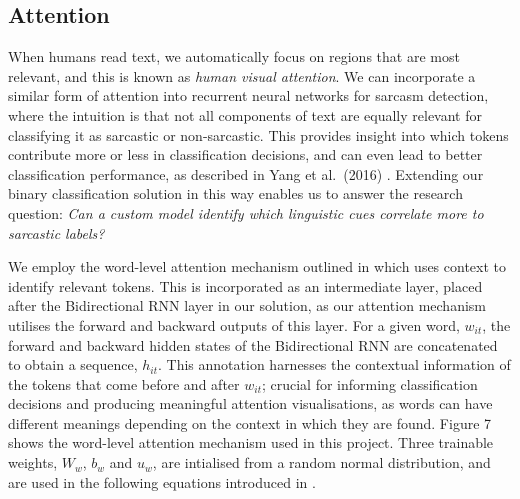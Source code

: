\documentclass[12pt,a4paper]{article}
\begin{document}

\subsection{Attention}
\vspace{-4.2pt}
\noindent When humans read text, we automatically focus on regions that are most relevant, and this is known as \textit{human visual attention}. We can incorporate a similar form of attention into recurrent neural networks for sarcasm detection, where the intuition is that not all components of text are equally relevant for classifying it as sarcastic or non-sarcastic. This provides insight into which tokens contribute more or less in classification decisions, and can even lead to better classification performance, as described in Yang et al.\ (2016) \cite{yang2016hierarchical}. Extending our binary classification solution in this way enables us to answer the research question: \textit{Can a custom model identify which linguistic cues correlate more to sarcastic labels?}

We employ the word-level attention mechanism outlined in \cite{yang2016hierarchical} which uses context to identify relevant tokens. This is incorporated as an intermediate layer, placed after the Bidirectional RNN layer in our solution, as our attention mechanism utilises the forward and backward outputs of this layer. For a given word, $w_{it}$, the forward and backward hidden states of the Bidirectional RNN are concatenated to obtain a sequence, $h_{it}$. This annotation harnesses the contextual information of the tokens that come before and after $w_{it}$; crucial for informing classification decisions and producing meaningful attention visualisations, as words can have different meanings depending on the context in which they are found. Figure 7 shows the word-level attention mechanism used in this project. Three trainable weights, $W_w$, $b_w$ and $u_w$, are intialised from a random normal distribution, and are used in the following equations introduced in \cite{yang2016hierarchical}.\\\vspace{-16pt}
\end{document}
